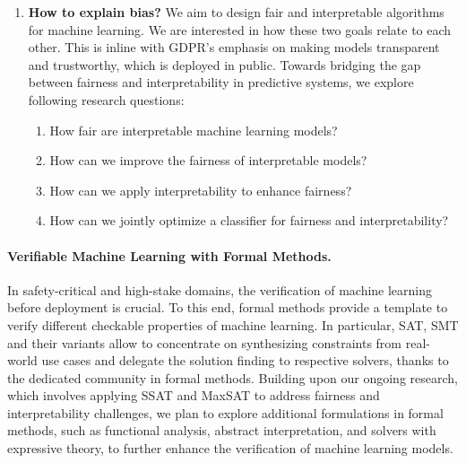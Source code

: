 \begin{itemize}
\begin{enumerate}
		\item \textbf{How to explain bias?} We aim to design fair and interpretable algorithms for  machine learning. We are interested in how these two goals relate to each other. This is inline with GDPR's emphasis on making models transparent and trustworthy, which is deployed in public.	Towards bridging the gap between fairness and interpretability in predictive systems, we explore following research questions:
		
		\begin{enumerate}
			\item How fair are interpretable machine learning models? 
			\item How can we improve the fairness of interpretable models?
			\item How can we apply interpretability to enhance fairness?
			\item How can we jointly optimize a classifier for  fairness and interpretability?
		\end{enumerate}
	
	
	\end{enumerate}
\end{itemize}



\paragraph{Verifiable Machine Learning with Formal Methods.} In safety-critical and high-stake domains, the verification of machine learning before deployment is crucial. To this end, formal methods provide a template to verify different checkable properties of machine learning. In particular, SAT, SMT and their variants allow to concentrate on synthesizing constraints from real-world use cases and delegate the solution finding to respective solvers, thanks to the dedicated community in formal methods. Building upon our ongoing research, which involves applying SSAT and MaxSAT to address fairness and interpretability challenges, we plan to explore additional formulations in formal methods, such as functional analysis, abstract interpretation, and solvers with expressive theory, to further enhance the verification of machine learning models.






